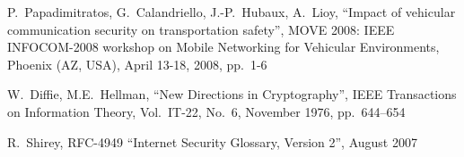 \documentclass[a4paper,12pt]{article}
\def\rfc#1{RFC-#1\xspace}%
\begin{document}
\begin{thebibliography}{99}
%
%

P.~Papadimitratos, G.~Calandriello, J.-P.~Hubaux, A.~Lioy, ``Impact of vehicular
communication security on transportation safety'', MOVE 2008: IEEE INFOCOM-2008
workshop on Mobile Networking for Vehicular Environments, Phoenix (AZ, USA),
April 13-18, 2008, pp.~1-6 

W.~Diffie, M.E.~Hellman, ``New Directions in Cryptography'', IEEE Transactions
on Information Theory, Vol.~IT-22, No.~6, November 1976, pp.~644--654

R.~Shirey, \rfc{4949} ``Internet Security Glossary, Version 2'', August 2007

\end{thebibliography}
\end{document}
